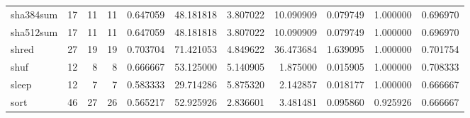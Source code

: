 \begin{tabular}{lrrrrrrrrrr}
sha384sum &                                      17 &                 11 &                                11 &                                   0.647059 &                              48.181818 &                                     3.807022 &                         10.090909 &                                0.079749 &                           1.000000 &                                           0.696970 \\
sha512sum &                                      17 &                 11 &                                11 &                                   0.647059 &                              48.181818 &                                     3.807022 &                         10.090909 &                                0.079749 &                           1.000000 &                                           0.696970 \\
shred     &                                      27 &                 19 &                                19 &                                   0.703704 &                              71.421053 &                                     4.849622 &                         36.473684 &                                1.639095 &                           1.000000 &                                           0.701754 \\
shuf      &                                      12 &                  8 &                                 8 &                                   0.666667 &                              53.125000 &                                     5.140905 &                          1.875000 &                                0.015905 &                           1.000000 &                                           0.708333 \\
sleep     &                                      12 &                  7 &                                 7 &                                   0.583333 &                              29.714286 &                                     5.875320 &                          2.142857 &                                0.018177 &                           1.000000 &                                           0.666667 \\
sort      &                                      46 &                 27 &                                26 &                                   0.565217 &                              52.925926 &                                     2.836601 &                          3.481481 &                                0.095860 &                           0.925926 &                                           0.666667 \\

\end{tabular}
